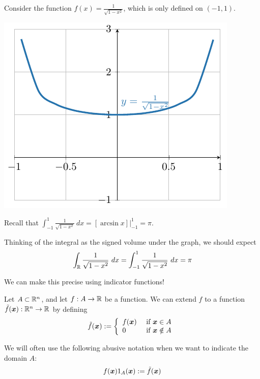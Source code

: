    \begin{example}
        Consider the function $f(x) = \frac{1}{\sqrt{1-x^2}}$, which is only defined on $(-1,1)$.

        \begin{center}
            \includegraphics{chapters/4-IntegrationRn/figures/figures-undefinedonr.pdf}
        \end{center}
        Recall that $\int_{-1}^1 \frac{1}{\sqrt{1-x^2}} \ dx = \left[\arcsin{x}\right] \bigg|_{-1}^1 = \pi$.
    \end{example}

Thinking of the integral as the signed volume under the graph, we should expect $$\int_{\mathbb{R}} \frac{1}{\sqrt{1-x^2}} \ dx = \int_{-1}^1 \frac{1}{\sqrt{1-x^2}} \ dx = \pi$$

    We can make this precise using indicator functions!  

    \begin{definition}
     Let $A \subset \mathbb{R}^n$, and let $f : A \to \mathbb{R}$ be a function. We can extend $f$ to a function $\Tilde{f}(\bm{x}) : \mathbb{R}^n \to \mathbb{R}$ by defining
    $$\Tilde{f}(\bm{x}) := \left\{
		\begin{array}{ll}
			f(\bm{x}) & \text{ if } \bm{x} \in A \\
			0 & \text{ if } \bm{x} \notin A
		\end{array}
		\right.$$
        
    We will often use the following abusive notation when we want to indicate the domain $A$:
    $$f(\bm{x})1_A(\bm{x}) := \Tilde{f}(\bm{x})$$   
    \end{definition}

